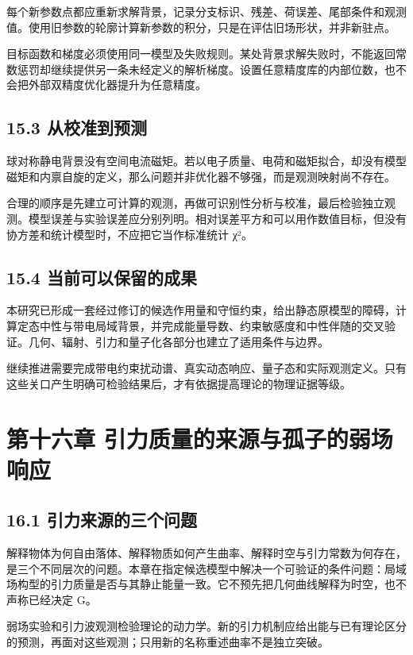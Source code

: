 \documentclass[UTF8,fontset=fandol,11pt]{ctexart}
\begin{document}
每个新参数点都应重新求解背景，记录分支标识、残差、荷误差、尾部条件和观测值。使用旧参数的轮廓计算新参数的积分，只是在评估旧场形状，并非新驻点。

目标函数和梯度必须使用同一模型及失败规则。某处背景求解失败时，不能返回常数惩罚却继续提供另一条未经定义的解析梯度。设置任意精度库的内部位数，也不会把外部双精度优化器提升为任意精度。

\subsection*{15.3 从校准到预测}

球对称静电背景没有空间电流磁矩。若以电子质量、电荷和磁矩拟合，却没有模型磁矩和内禀自旋的定义，那么问题并非优化器不够强，而是观测映射尚不存在。

合理的顺序是先建立可计算的观测，再做可识别性分析与校准，最后检验独立观测。模型误差与实验误差应分别列明。相对误差平方和可以用作数值目标，但没有协方差和统计模型时，不应把它当作标准统计 χ²。

\subsection*{15.4 当前可以保留的成果}

本研究已形成一套经过修订的候选作用量和守恒约束，给出静态原模型的障碍，计算定态中性与带电局域背景，并完成能量导数、约束敏感度和中性伴随的交叉验证。几何、辐射、引力和量子化各部分也建立了适用条件与边界。

继续推进需要完成带电约束扰动谱、真实动态响应、量子态和实际观测定义。只有这些关口产生明确可检验结果后，才有依据提高理论的物理证据等级。

\section*{第十六章 引力质量的来源与孤子的弱场响应}

\subsection*{16.1 引力来源的三个问题}

解释物体为何自由落体、解释物质如何产生曲率、解释时空与引力常数为何存在，是三个不同层次的问题。本章在指定候选模型中解决一个可验证的条件问题：局域场构型的引力质量是否与其静止能量一致。它不预先把几何曲线解释为时空，也不声称已经决定 G。

弱场实验和引力波观测检验理论的动力学。新的引力机制应给出能与已有理论区分的预测，再面对这些观测；只用新的名称重述曲率不是独立突破。
\end{document}
